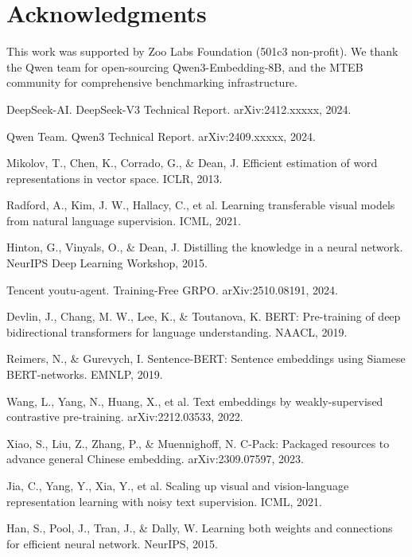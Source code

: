 \documentclass[11pt,letterpaper]{article}
\begin{document}
\section*{Acknowledgments}

This work was supported by Zoo Labs Foundation (501c3 non-profit). We thank the Qwen team for open-sourcing Qwen3-Embedding-8B, and the MTEB community for comprehensive benchmarking infrastructure.

\begin{thebibliography}{99}

DeepSeek-AI. DeepSeek-V3 Technical Report. arXiv:2412.xxxxx, 2024.

Qwen Team. Qwen3 Technical Report. arXiv:2409.xxxxx, 2024.

Mikolov, T., Chen, K., Corrado, G., \& Dean, J. Efficient estimation of word representations in vector space. ICLR, 2013.

Radford, A., Kim, J. W., Hallacy, C., et al. Learning transferable visual models from natural language supervision. ICML, 2021.

Hinton, G., Vinyals, O., \& Dean, J. Distilling the knowledge in a neural network. NeurIPS Deep Learning Workshop, 2015.

Tencent youtu-agent. Training-Free GRPO. arXiv:2510.08191, 2024.

Devlin, J., Chang, M. W., Lee, K., \& Toutanova, K. BERT: Pre-training of deep bidirectional transformers for language understanding. NAACL, 2019.

Reimers, N., \& Gurevych, I. Sentence-BERT: Sentence embeddings using Siamese BERT-networks. EMNLP, 2019.

Wang, L., Yang, N., Huang, X., et al. Text embeddings by weakly-supervised contrastive pre-training. arXiv:2212.03533, 2022.

Xiao, S., Liu, Z., Zhang, P., \& Muennighoff, N. C-Pack: Packaged resources to advance general Chinese embedding. arXiv:2309.07597, 2023.

Jia, C., Yang, Y., Xia, Y., et al. Scaling up visual and vision-language representation learning with noisy text supervision. ICML, 2021.

Han, S., Pool, J., Tran, J., \& Dally, W. Learning both weights and connections for efficient neural network. NeurIPS, 2015.


\end{thebibliography}
\end{document}
